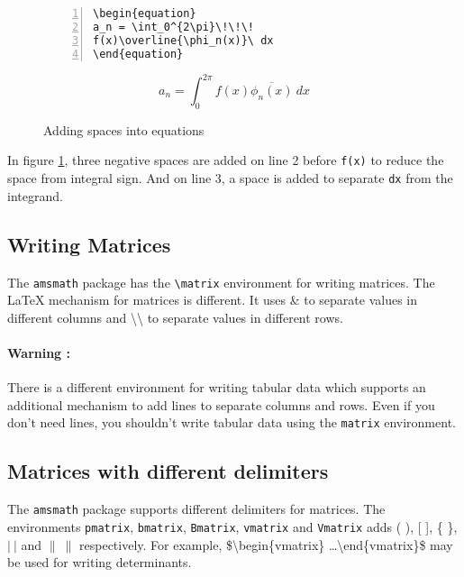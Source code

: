 \documentclass{article}
\begin{document}
\begin{figure}[h]
\centering
\begin{minipage}{0.45\textwidth}
\begin{Verbatim}[numbers = left]
\begin{equation}
a_n = \int_0^{2\pi}\!\!\!
f(x)\overline{\phi_n(x)}\ dx
\end{equation}
\end{Verbatim}
\end{minipage}
\begin{minipage}{0.45\textwidth}
\begin{equation}
a_n = \int_0^{2\pi}\!\!\! f(x)\overline{\phi_n(x)}\ dx
\end{equation}
\end{minipage} 
\caption{Adding spaces into equations}
\label{fig:spaceInEquation}
\end{figure}

In figure \ref{fig:spaceInEquation}, three negative spaces are added on line 2 before \texttt{f(x)} to reduce the space from integral sign. And on line 3, a space is added to separate \texttt{dx} from the integrand.

\subsection{Writing Matrices}
	The \texttt{amsmath} package has the \texttt{\textbackslash matrix} environment for writing matrices. The \LaTeX{} mechanism for matrices is different. It uses \& to separate values in different columns and \textbackslash{}\textbackslash{} to separate values in different rows. 

\paragraph{Warning :}
	There is a different environment for writing tabular data which supports an additional mechanism to add lines to separate columns and rows. Even if you don't need lines, you shouldn't write tabular data using the \texttt{matrix} environment.

\subsection{Matrices with different delimiters}
	The \texttt{amsmath} package supports different delimiters for matrices. The environments \texttt{pmatrix}, \texttt{bmatrix}, \texttt{Bmatrix}, \texttt{vmatrix} and \texttt{Vmatrix} adds ( ), [ ], \{ \}, $|\ |$ and $\|\ \|$ respectively. For example, \$\textbackslash begin\{vmatrix\} \dots \textbackslash end\{vmatrix\}\$ may be used for writing determinants.
	
\end{document}
